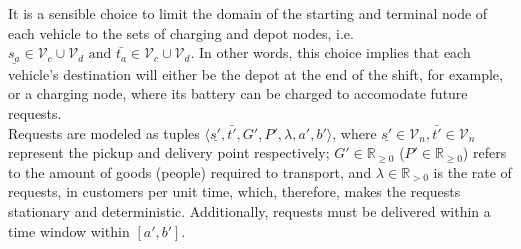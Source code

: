 It is a sensible choice to limit the domain of the starting and terminal node of each vehicle to the sets of charging and depot nodes, i.e. $\underline{s_a}\in\mathcal{V}_c \cup \mathcal{V}_d \text{ and } \bar{t_a}\in \mathcal{V}_c \cup \mathcal{V}_d$. In other words, this choice implies that each vehicle's destination will either be the depot at the end of the shift, for example, or a charging node, where its battery can be charged to accomodate future requests. \\
Requests are modeled as tuples $\langle \underline{s'},\bar{t'}, G', P',\lambda, a', b'\rangle$, where  $\underline{s'} \in \mathcal{V}_n,\bar{t'} \in \mathcal{V}_n$ represent the pickup and delivery point respectively; $G'\in \mathbb{R}_{\ge0}$ ($P'\in \mathbb{R}_{\ge0}$) refers to the amount of goods (people) required to transport,  and $\lambda \in \mathbb{R}_{>0}$ is the rate of requests, in customers per unit time, which, therefore, makes the requests stationary and deterministic. Additionally, requests must be delivered within a time window within $[a',b']$. \\



